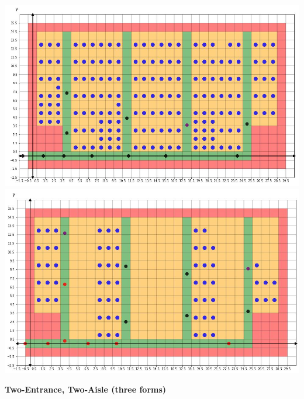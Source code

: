 \documentclass{article}
\theoremstyle{definition}
\theoremstyle{remark}
\numberwithin{equation}{section}
\begin{document}
\begin{center}
		\includegraphics[width = 14cm]{fw4.png} \\
		\clearpage
		\thispagestyle{empty}
		\includegraphics[width = 14cm]{fw5.png} \\
	\end{center}
	\large \textbf{Two-Entrance, Two-Aisle (three forms)}
\end{document}

